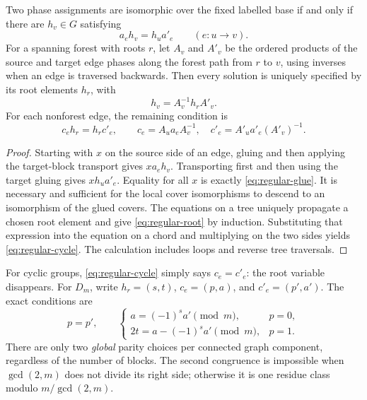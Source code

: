 \begin{theorem}
Two phase assignments are isomorphic over the fixed labelled base if and
only if there are $h_v\in G$ satisfying
\begin{equation}\label{eq:regular-glue}
 a_eh_v=h_ua'_e\qquad(e:u\to v).
\end{equation}
For a spanning forest with roots $r$, let $A_v$ and $A'_v$ be the ordered
products of the source and target edge phases along the forest path from
$r$ to $v$, using inverses when an edge is traversed backwards.  Then
every solution is uniquely specified by its root elements $h_r$, with
\begin{equation}\label{eq:regular-root}
 h_v=A_v^{-1}h_rA'_v.
\end{equation}
For each nonforest edge, the remaining condition is
\begin{equation}\label{eq:regular-cycle}
 c_eh_r=h_rc'_e,\qquad
 c_e=A_ua_eA_v^{-1},\quad
 c'_e=A'_ua'_e(A'_v)^{-1}.
\end{equation}
\end{theorem}
\begin{proof}
Starting with $x$ on the source side of an edge, gluing and then applying
the target-block transport gives $xa_eh_v$.  Transporting first and then
using the target gluing gives $xh_ua'_e$.  Equality for all $x$ is exactly
\eqref{eq:regular-glue}.  It is necessary and sufficient for the local
cover isomorphisms to descend to an isomorphism of the glued covers.
The equations on a tree uniquely propagate a chosen root element and
give \eqref{eq:regular-root} by induction.  Substituting that expression
into the equation on a chord and multiplying on the two sides yields
\eqref{eq:regular-cycle}.  The calculation includes loops and reverse
tree traversals.
\end{proof}

For cyclic groups, \eqref{eq:regular-cycle} simply says $c_e=c'_e$:
the root variable disappears.  For $D_m$, write
$h_r=(s,t)$, $c_e=(p,a)$, and $c'_e=(p',a')$.  The exact conditions are
\[
 p=p',\qquad
 \begin{cases}
 a=(-1)^sa'\pmod m,&p=0,\\
 2t=a-(-1)^sa'\pmod m,&p=1.
 \end{cases}
\]
There are only two \emph{global} parity choices per connected graph
component, regardless of the number of blocks.  The second congruence
is impossible when $\gcd(2,m)$ does not divide its right side; otherwise
it is one residue class modulo $m/\gcd(2,m)$.

